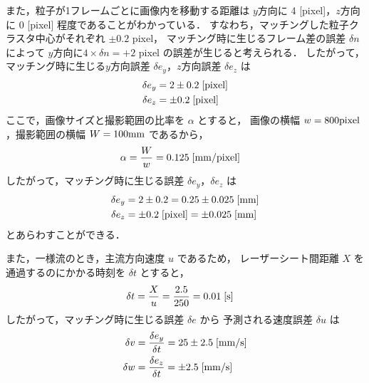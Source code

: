 \documentclass[twocolumn,a4j]{jsarticle}
\begin{document}
また，粒子が1フレームごとに画像内を移動する距離は $y$方向に
4 [pixel]，$z$方向に 0 [pixel] 程度であることがわかっている．
すなわち，マッチングした粒子クラスタ中心がそれぞれ $\pm 0.2$ pixel，
マッチング時に生じるフレーム差の誤差 $\delta n$ によって
$y$方向に$4 \times \delta n = +2$ pixel の誤差が生じると考えられる．
したがって，マッチング時に生じる$y$方向誤差 $\delta e_y$，$z$方向誤差 $\delta e_z$ は
\begin{align*}
  \delta e_y & = 2 \pm 0.2 \;\rm{[pixel]} \\
  \delta e_z & = \pm 0.2 \;\rm{[pixel]}
\end{align*}
ここで，画像サイズと撮影範囲の比率を $\alpha$ とすると，
画像の横幅 $w = 800 \rm{pixel}$，撮影範囲の横幅 $W = 100 \rm{mm}$ であるから，
\begin{align*}
  \alpha & = \frac{W}{w} = 0.125 \;\rm{[mm/pixel]}
\end{align*}
したがって，マッチング時に生じる誤差 $\delta e_y$，$\delta e_z$ は
\begin{align*}
  \delta e_y & = 2 \pm 0.2  = 0.25 \pm 0.025 \;\rm{[mm]}        \\
  \delta e_z & = \pm 0.2 \;\rm{[pixel]} = \pm 0.025 \;\rm{[mm]}
\end{align*}
とあらわすことができる．

また，一様流のとき，主流方向速度 $u$ であるため，
レーザーシート間距離 $X$ を通過するのにかかる時刻を $\delta t$ とすると，
\begin{align*}
  \delta t & = \frac{X}{u} = \frac{2.5}{250} = 0.01 \;\rm{[s]}
\end{align*}
したがって，マッチング時に生じる誤差 $\delta e$ から
予測される速度誤差 $\delta u$ は
\begin{align*}
  \delta v & = \frac{\delta e_y}{\delta t} = 25 \pm 2.5 \;\rm{[mm/s]} \\
  \delta w & = \frac{\delta e_z}{\delta t} = \pm 2.5 \;\rm{[mm/s]}
\end{align*}

\newpage
\end{document}
